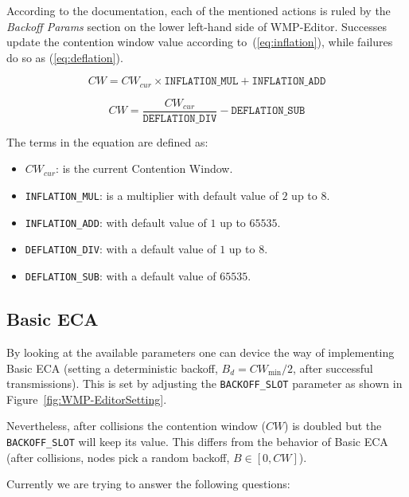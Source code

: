 According to the documentation, each of the mentioned actions is ruled by the \emph{Backoff Params} section on the lower left-hand side of WMP-Editor. Successes update the contention window value according to~(\ref{eq:inflation}), while failures do so as (\ref{eq:deflation}).

\begin{equation} \label{eq:inflation}
  CW = CW_{cur}\times\texttt{INFLATION\_MUL}+\texttt{INFLATION\_ADD}
\end{equation}

\begin{equation} \label{eq:deflation}
  CW = \frac{CW_{cur}}{\texttt{DEFLATION\_DIV}}-\texttt{DEFLATION\_SUB}
\end{equation}

The terms in the equation are defined as:

\begin{itemize}
 \item $CW_{cur}$: is the current Contention Window.
 \item \texttt{INFLATION\_MUL}: is a multiplier with default value of $2$ up to $8$.
 \item \texttt{INFLATION\_ADD}: with default value of $1$ up to $65535$.
 \item \texttt{DEFLATION\_DIV}: with a default value of $1$ up to $8$.
 \item \texttt{DEFLATION\_SUB}: with a default value of $65535$.
\end{itemize}

\subsection{Basic ECA}

By looking at the available parameters one can device the way of implementing Basic ECA (setting a deterministic backoff, $B_{d}=CW_{\min}/2$, after successful transmissions). This is set by adjusting the \texttt{BACKOFF\_SLOT} parameter as shown in Figure~\ref{fig:WMP-EditorSetting}.

Nevertheless, after collisions the contention window ($CW$) is doubled but the \texttt{BACKOFF\_SLOT} will keep its value. This differs from the behavior of Basic ECA (after collisions, nodes pick a random backoff, $B\in[0,CW]$).

Currently we are trying to answer the following questions:

